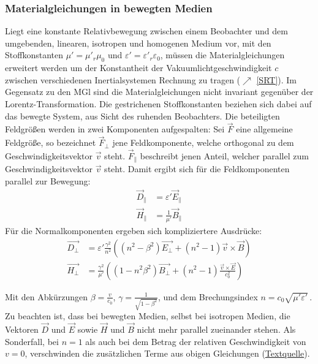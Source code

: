  \subsubsection{Materialgleichungen in bewegten Medien}
 Liegt eine konstante Relativbewegung zwischen einem Beobachter und dem umgebenden, linearen, isotropen und homogenen Medium vor, mit den Stoffkonstanten $\mu' = \mu'_r\mu_0$  und $\varepsilon' = \varepsilon'_r \varepsilon_0$, müssen die Materialgleichungen erweitert werden um der Konstantheit der Vakuumlichtgeschwindigkeit $c$ zwischen verschiedenen Inertialsystemen Rechnung zu tragen ($\nearrow$ \ref{SRT}). Im Gegensatz zu den MGl sind die Materialgleichungen nicht invariant gegenüber der Lorentz-Transformation. Die gestrichenen Stoffkonstanten beziehen sich dabei auf das bewegte System, aus Sicht des ruhenden Beobachters. Die beteiligten Feldgrößen werden in zwei Komponenten aufgespalten: Sei $\vec{F}$ eine allgemeine Feldgröße, so bezeichnet $\vec{F}_\bot$ jene Feldkomponente, welche orthogonal zu dem Geschwindigkeitsvektor $\vec{v}$ steht. $\vec{F}_\|$ beschreibt jenen Anteil, welcher parallel zum Geschwindigkeitsvektor $\vec{v}$ steht. Damit ergibt sich für die Feldkomponenten parallel zur Bewegung:
 \begin{equation}\begin{split}\vec D_\| &=\varepsilon ' \vec E_\| \\
 		\vec H_\| &=\frac{1}{\mu '} \vec B_\|\end{split}\end{equation}
 Für die Normalkomponenten ergeben sich kompliziertere Ausdrücke:
 \begin{equation}\begin{split}\vec{D_\bot} &=\varepsilon ' \frac{\gamma^2}{n^2} \left( (n^2 - \beta^2) \vec{E_\bot} + (n^2 - 1)\vec{v} \times \vec{B} \right ) \\
 		\vec{H_\bot} &=\frac{\gamma^2}{\mu '} \left( (1 - n^2 \beta^2)\vec{B_\bot} + (n^2 - 1) \frac{\vec{v} \times \vec{E}}{c_0^2} \right )\end{split}\end{equation}
 
 Mit den Abkürzungen $\beta = \frac{v}{c_0}$, $\gamma = \frac{1}{\sqrt{1-\beta^2}}$, und dem Brechungsindex $n = c_0 \sqrt{\mu ' \varepsilon '}\,$. Zu beachten ist, dass bei bewegten Medien, selbst bei isotropen Medien, die Vektoren $\vec{D}$ und $\vec{E}$ sowie $\vec{H}$ und $\vec{B}$ nicht mehr parallel zueinander stehen.
 Als Sonderfall, bei $n=1$ als auch bei dem Betrag der relativen Geschwindigkeit von $v=0$, verschwinden die zusätzlichen Terme aus obigen Gleichungen (\href{https://de.wikipedia.org/wiki/Materialgleichungen_der_Elektrodynamik}{Textquelle}).
